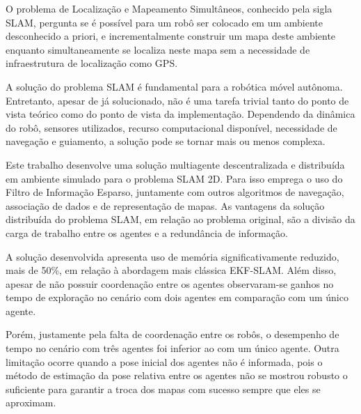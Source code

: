 O problema de Localização e Mapeamento Simultâneos, conhecido pela sigla SLAM, pergunta se é possível para um robô ser colocado em um ambiente 
desconhecido a priori, e incrementalmente construir um mapa deste 
ambiente enquanto simultaneamente se localiza neste mapa sem a 
necessidade de infraestrutura de localização como GPS.

A solução do problema SLAM é fundamental para a robótica móvel 
autônoma. Entretanto, apesar de já solucionado, não é uma tarefa trivial 
tanto do ponto de vista teórico como do ponto de vista da implementação. 
Dependendo da dinâmica do robô, sensores utilizados, recurso 
computacional disponível, necessidade de navegação e guiamento, a solução 
pode se tornar mais ou menos complexa.

Este trabalho desenvolve uma solução multiagente descentralizada e distribuída em ambiente simulado 
para o problema SLAM 2D. Para isso emprega o uso do Filtro de Informação 
Esparso, juntamente com outros algoritmos de navegação, associação de 
dados e de representação de mapas. As vantagens da solução distribuída do 
problema SLAM, em relação ao problema original, são a divisão da carga 
de trabalho entre os agentes e a redundância de informação.

A solução desenvolvida apresenta uso de memória significativamente 
reduzido, mais de 50\%, em relação à abordagem mais clássica EKF-SLAM. 
Além disso, apesar de não possuir coordenação entre os agentes 
observaram-se ganhos no tempo de exploração no cenário com dois agentes 
em comparação com um único agente.

Porém, justamente pela falta de 
coordenação entre os robôs, o desempenho de tempo no cenário com 
três agentes foi inferior ao com um único agente. Outra limitação ocorre 
quando a pose inicial dos agentes não é informada, pois o método de 
estimação da pose relativa entre os agentes não se mostrou robusto o 
suficiente para garantir a troca dos mapas com sucesso sempre que eles se 
aproximam.